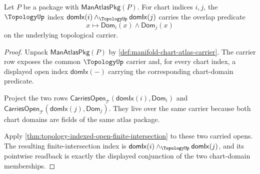 \begin{theorem}
\label{thm:manifoldup-chart-domain-intersection-open}
Let $P$ be a package with $\mathsf{ManAtlasPkg}(P)$. For chart indices $i,j$,
the $\TopologyUp$ index
$\mathsf{domIx}(i)\wedge_{\TopologyUp}\mathsf{domIx}(j)$ carries the overlap
predicate
$$
x\longmapsto \mathsf{Dom}_i(x)\wedge\mathsf{Dom}_j(x)
$$
on the underlying topological carrier.
\end{theorem}
\begin{proof}
Unpack $\mathsf{ManAtlasPkg}(P)$ by
\autoref{def:manifold-chart-atlas-carrier}. The carrier row exposes the common
$\TopologyUp$ carrier and, for every chart index, a displayed open index
$\mathsf{domIx}(-)$ carrying the corresponding chart-domain predicate.

Project the two rows
$\mathsf{CarriesOpen}_{\mathcal{T}}(\mathsf{domIx}(i),\mathsf{Dom}_i)$ and
$\mathsf{CarriesOpen}_{\mathcal{T}}(\mathsf{domIx}(j),\mathsf{Dom}_j)$. They
live over the same carrier because both chart domains are fields of the same
atlas package.

Apply \autoref{thm:topology-indexed-open-finite-intersection} to these two
carried opens. The resulting finite-intersection index is
$\mathsf{domIx}(i)\wedge_{\TopologyUp}\mathsf{domIx}(j)$, and its pointwise
readback is exactly the displayed conjunction of the two chart-domain
memberships.
\end{proof}

